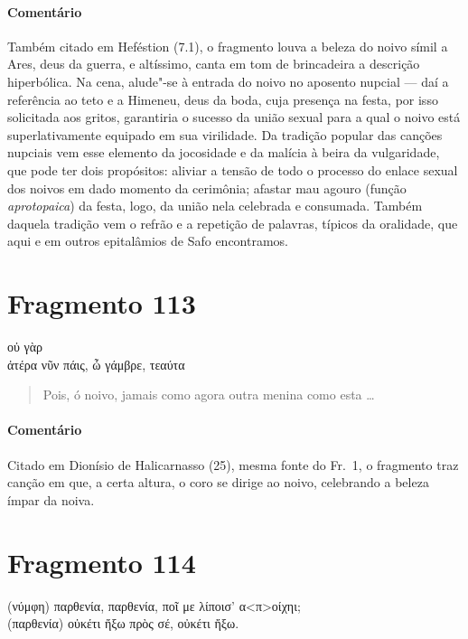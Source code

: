 {{\paragraph{Comentário} Também citado em Heféstion (7.1), o fragmento louva a beleza do noivo símil a Ares,
deus da guerra, e altíssimo, canta em tom de brincadeira a descrição
hiperbólica. Na cena, alude"-se à entrada do noivo no aposento nupcial --- daí a
referência ao teto e a Himeneu, deus da boda, cuja presença na festa, por isso
solicitada aos gritos, garantiria o sucesso da união sexual para a qual o noivo está superlativamente equipado em sua virilidade. Da tradição popular das canções nupciais vem esse elemento da jocosidade e da malícia à beira da vulgaridade, que pode ter dois propósitos: aliviar a tensão de todo o processo do enlace sexual dos noivos em dado momento da cerimônia; afastar mau agouro (função \textit{aprotopaica}) da festa, logo, da união nela celebrada e consumada. Também daquela tradição vem o refrão e a repetição de palavras, típicos da oralidade, que aqui e em outros epitalâmios de Safo encontramos.}


\section{Fragmento 113}

\begin{gkverse}
  οὐ γὰρ\\
ἀτέρα νῦν πάις, ὦ γάμβρε, τεαύτα
\end{gkverse}

\begin{verse}
Pois, ó noivo, jamais como agora outra menina como esta \ldots{}
\end{verse}

{\paragraph{Comentário} Citado em Dionísio de Halicarnasso (25), mesma fonte do Fr.~1, o fragmento traz canção em que, a certa altura, o coro se dirige ao noivo, celebrando a beleza ímpar da noiva.}


\pagebreak
\section{Fragmento 114}

\begin{gkverse}
(νύμφη) παρθενία, παρθενία, ποῖ με λίποισ’ α<π>οίχηι;\\
(παρθενία)  \dagger{}οὐκέτι ἤξω πρὸς σέ, οὐκέτι ἤξω\dagger{}.
\end{gkverse}

}
